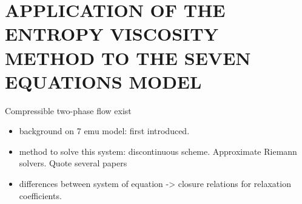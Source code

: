 %
%
%


\chapter{\uppercase {Application of the entropy viscosity method to the seven equations model}}\label{chap:seven}
%
Compressible two-phase flow exist
\begin{itemize}
\item background on 7 emu model: first introduced. 
\item method to solve this system: discontinuous scheme. Approximate Riemann solvers. Quote several papers
\item differences between system of equation -> closure relations for relaxation coefficients.
\end{itemize}
